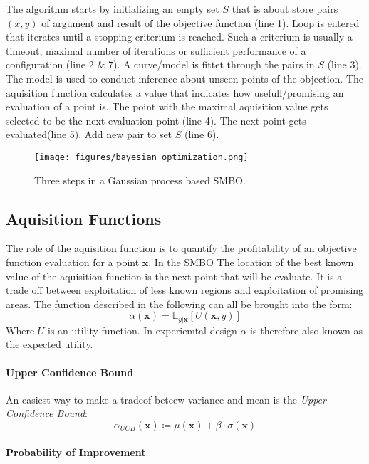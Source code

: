\documentclass[english]{article}
\newcommand{\x}{\mathbf{x}}
\newcommand{\E}{\mathbb{E}}
\begin{document}
The algorithm starts by initializing an empty set $S$ that is about store pairs $(x,y)$ of argument and result of the objective function (line 1). Loop is entered that iterates until a stopping criterium is reached. Such a criterium is usually a timeout, maximal number of iterations or sufficient performance of a configuration (line 2 \& 7). A curve/model is fittet through the pairs in $S$ (line 3). The model is used to conduct inference about unseen points of the objection. The aquisition function calculates a value that indicates how usefull/promising an evaluation of a point is. The point with the maximal aquisition value gets selected to be the next evaluation point (line 4). The next point gets evaluated(line 5). Add new pair to set $S$ (line 6).

\begin{figure}
  \texttt{[image: figures/bayesian\_optimization.png]}
  \caption{Three steps in a Gaussian process based SMBO.}
  \label{bayesian optimization}
\end{figure}

\subsection{Aquisition Functions}
\label{aquifuncs}
The role of the aquisition function is to quantify the profitability of an objective function evaluation for a point $\x$. In the SMBO The location of the best known value of the aquisition function is the next point that will be evaluate. It is a trade off between exploitation of less known regions and exploitation of promising areas. The function described in the following can all be brought into the form:
\begin{equation}
  \alpha(\x) = \E_{y|\x}[U(\x,y)]
\end{equation}
Where $U$ is an utility function. In experiemtal design $\alpha$ is therefore also known as the expected utility.

\paragraph{Upper Confidence Bound}
An easiest way to make a tradeof beteew variance and mean is the \textit{Upper Confidence Bound}:
\begin{equation}
  \alpha_{UCB}(\x) \coloneqq \mu(\x) + \beta \cdot \sigma(\x)
\end{equation}

\paragraph{Probability of Improvement}
\end{document}
